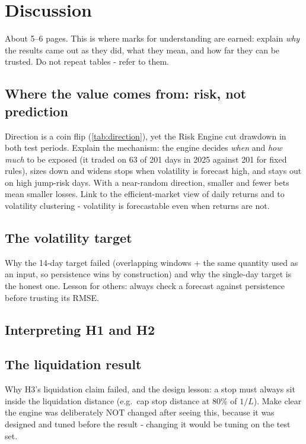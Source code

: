 \chapter{Discussion}\label{ch:discussion}

\begin{guide}
About 5--6 pages. This is where marks for understanding are earned: explain \emph{why} the results came out as they did, what they mean, and how far they can be trusted. Do not repeat tables - refer to them.
\end{guide}

\section{Where the value comes from: risk, not prediction}
\begin{guide}
Direction is a coin flip (\cref{tab:direction}), yet the Risk Engine cut drawdown in both test periods. Explain the mechanism: the engine decides \emph{when} and \emph{how much} to be exposed (it traded on 63 of 201 days in 2025 against 201 for fixed rules), sizes down and widens stops when volatility is forecast high, and stays out on high jump-risk days. With a near-random direction, smaller and fewer bets mean smaller losses. Link to the efficient-market view of daily returns and to volatility clustering - volatility is forecastable even when returns are not.
\end{guide}
\tbc{}

\section{The volatility target}
\begin{guide}
Why the 14-day target failed (overlapping windows + the same quantity used as an input, so persistence wins by construction) and why the single-day target is the honest one. Lesson for others: always check a forecast against persistence before trusting its RMSE.
\end{guide}
\tbc{}

\section{Interpreting H1 and H2}

\section{The liquidation result}
\begin{guide}
Why H3's liquidation claim failed, and the design lesson: a stop must always sit inside the liquidation distance (e.g.\ cap stop distance at 80\% of $1/L$). Make clear the engine was deliberately NOT changed after seeing this, because it was designed and tuned before the result - changing it would be tuning on the test set.
\end{guide}
\tbc{}

